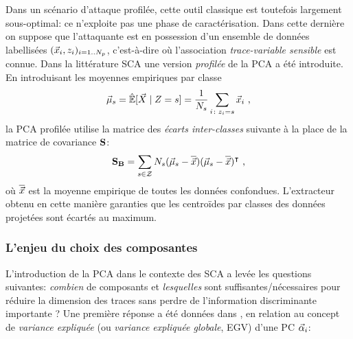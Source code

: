 Dans un sc\'{e}nario d'attaque profil\'{e}e, cette outil classique est toutefois largement sous-optimal: ce n'exploite pas une phase de caract\'{e}risation. Dans cette derni\`{e}re on suppose que l'attaquante est en possession d'un ensemble de donn\'{e}es labellis\'{e}es  $(\vec{x}_i, z_i)_{i=1..N_p}$, c'est-\`{a}-dire o\`{u} l'association \emph{trace-variable sensible} est connue. Dans la litt\'{e}rature SCA \cite{TAprincipal,choudaryefficient,choudary2014efficient,disassembler,Standaert2008} une version \emph{profil\'{e}e} de la PCA a \'{e}t\'{e} introduite. En introduisant les moyennes empiriques par classe
\begin{equation}\label{eq:mmmXclass}
\mmmXclass= \esperEst[\given{\vaLeakVec}{\sensRandVar = \sensVarGenValue}] = \frac{1}{\nbTracesPerClass}\sum_{i\colon \sensVar_i=\sensVarGenValue} \vLeakVec_i  \mbox{ ,}
\end{equation}
la PCA profil\'{e}e utilise la matrice des \emph{\'{e}carts inter-classes} suivante \`{a} la place de la matrice de covariance $\textbf{S}$:
\begin{equation}\label{eq:SB}
\textbf{S}_{\textbf{B}} = \sum_{s\in\mathcal{Z}}N_{s}(\vec{\mu}_{s}-\overline{\vec{x}})(\vec{\mu}_{s}-\overline{\vec{x}})^\intercal \mbox{ ,}
\end{equation}
o\`{u} $\overline{\vec{x}}$ est la moyenne empirique de toutes les donn\'{e}es confondues. L'extracteur obtenu en cette mani\`{e}re garanties que les centro\"ides par classes des donn\'{e}es projet\'{e}es sont \'{e}cart\'{e}s au maximum.


\subsubsection{L'enjeu du choix des composantes}\label{sec:ELV}
L'introduction de la PCA dans le contexte des SCA a levée les questions suivantes: \textit{combien} de composants et \textit{lesquelles} sont suffisantes/nécessaires pour réduire la dimension des traces sans perdre de l'information discriminante importante ? 
%
Une première réponse a été données dans \cite{choudary2014efficient}, en relation au concept de \emph{variance expliquée} (ou \emph{variance expliquée globale}, EGV) d'une PC $\vec{\alpha}_i$:

